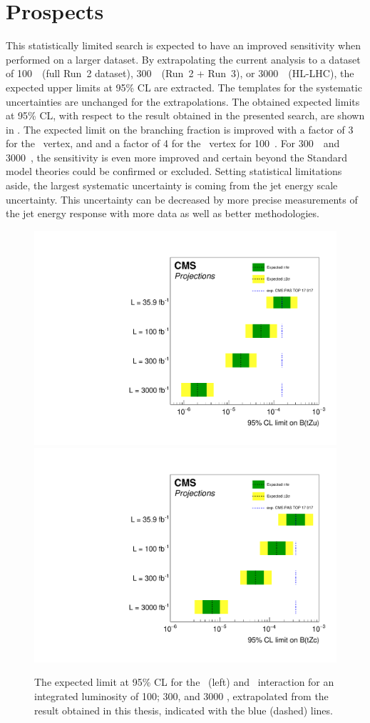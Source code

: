 \section{Prospects}
This statistically limited search is expected to have an improved sensitivity when performed on a larger dataset. By extrapolating the current analysis to a dataset of 100~\fbinv\ (full Run~2 dataset), 300~\fbinv\ (Run~2 + Run~3), or 3000~\fbinv\ (HL-LHC), the expected upper limits at 95\% CL are  extracted. %
The templates for the systematic uncertainties are unchanged for the extrapolations. The obtained expected limits at 95\% CL, with respect to the result obtained in the presented search, are shown in .  The expected limit on the branching fraction is improved with a factor of 3 for the \Zut\ vertex, and and a factor of 4 for the \Zct\ vertex for 100~\fbinv. For 300~\fbinv\ and 3000~\fbinv, the sensitivity is  even more improved and certain beyond the Standard model theories could be confirmed or excluded. Setting statistical limitations aside, the largest systematic uncertainty is coming from the jet energy scale uncertainty. This uncertainty can be decreased by more precise measurements of the jet energy response with more data as well as better methodologies. %
\begin{figure}
	\centering
	\includegraphics[width=0.49\linewidth]{7_Conclusion/Figures/TOP-17-017_limitsZutProj.pdf}
	\includegraphics[width=0.49\linewidth]{7_Conclusion/Figures/TOP-17-017_limitsZctproj.pdf}
	\caption{The expected limit at 95\% CL for the \Zut\ (left) and \Zct\ interaction for an integrated luminosity of 100; 300, and 3000 \fbinv, extrapolated from the result obtained in this thesis, indicated with the blue (dashed) lines. }
	\label{fig:proj} %
\end{figure}


